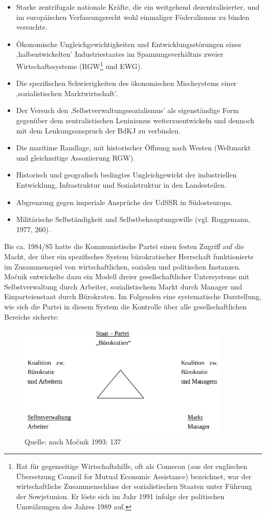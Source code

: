 \begin{itemize}
\item Starke zentrifugale nationale Kräfte, die ein weitgehend dezentralisierter, und im europäischen Verfassungsrecht wohl einmaliger Föderalismus zu binden versuchte.
\item Ökonomische Ungleichgewichtigkeiten und Entwicklungsstörungen eines ‚halbentwickelten’ Industriestaates im Spannungsverhältnis zweier Wirtschaftssysteme (RGW\footnote{Rat für gegenseitige Wirtschaftshilfe, oft als Comecon (aus der englischen Übersetzung Council for Mutual Economic Assistance) bezeichnet, war der wirtschaftliche Zusammenschluss der sozialistischen Staaten unter Führung der Sowjetunion. Er löste sich im Jahr 1991 infolge der politischen Umwälzungen des Jahres 1989 auf.} und EWG).
\item Die spezifischen Schwierigkeiten des ökonomischen Mischsystems einer ‚sozialistischen Marktwirtschaft’.
\item Der Versuch den ‚Selbstverwaltungssozialismus’ als eigenständige Form gegenüber dem zentralistischen Leninismus weiterzuentwickeln und dennoch mit dem Lenkungsanspruch der BdKJ zu verbinden.
\item Die maritime Randlage, mit historischer Öffnung nach Westen (Weltmarkt und gleichzeitige Assoziierung RGW).
\item Historisch und geografisch bedingtes Ungleichgewicht der industriellen Entwicklung, Infrastruktur und Sozialstruktur in den Landesteilen.
\item Abgrenzung gegen imperiale Ansprüche der UdSSR in Südosteuropa.
\item Militärische Selbständigkeit und Selbstbehauptungswille (vgl. Roggemann, 1977, 260).
\end{itemize}
Bis ca. 1984/85 hatte die Kommunistische Partei einen festen Zugriff auf die Macht, der über ein spezifisches System bürokratischer Herrschaft funktionierte im Zusammenspiel von wirtschaftlichen, sozialen und politischen Instanzen. Močnik entwickelte dazu ein Modell dreier gesellschaftlicher Untersysteme mit Selbstverwaltung durch Arbeiter, sozialistischem Markt durch Manager und Einparteienstaat durch Bürokraten. Im Folgenden eine systematische Darstellung, wie sich die Partei in diesem System die Kontrolle über alle gesellschaftlichen Bereiche sicherte:
\begin{figure}[H]
  \centering
  \includegraphics[width=4in]{Material/Parteienbuerokratie}
  \caption{Quelle: nach Močnik 1993: 137}
\end{figure}

